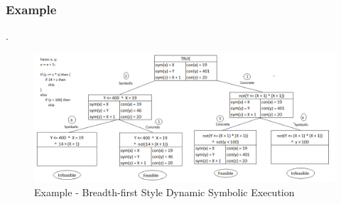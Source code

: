 \documentclass[11pt]{llncs}
\begin{document}
\begin{enumerate}
				
				\subsubsection{Example}
					.
					\begin{figure}[H]
						\includegraphics[width=1.17\textwidth]{DSE_BFS_Example.png}
						\caption{Example - Breadth-first Style Dynamic Symbolic Execution} \label{fig_2}
					\end{figure}
		
				\vspace{-12mm}

		
				
                \vspace{-3mm}
					
					
			\vspace{9mm}


\end{enumerate}
\end{document}

